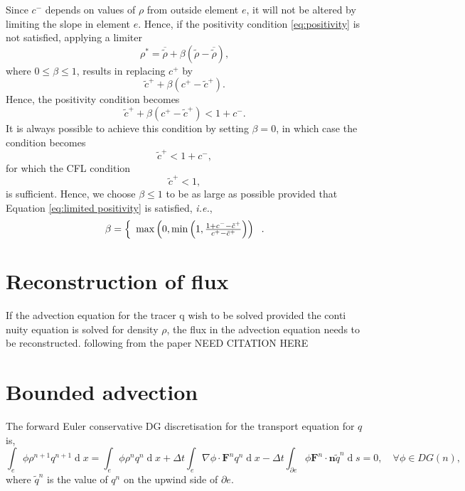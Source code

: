 \documentclass{article}
\def\MM#1{\boldsymbol{#1}}
\def\MM#1{\boldsymbol{#1}}
\DeclareMathOperator{\diff}{d}
\begin{document}
Since $c^-$ depends on values of $\rho$ from outside element $e$,
it will not be altered by limiting the slope in element $e$. Hence,
if the positivity condition \eqref{eq:positivity} is not satisfied,
applying a limiter
\begin{equation}
\rho^* = \overline{\tilde{\rho}} + \beta\left(
\tilde{\rho} - \overline{\tilde{\rho}}
\right),
\end{equation}
where $0\le \beta \le 1$, results in replacing $c^+$ by
\begin{equation}
\tilde{c}^+ + \beta(c^+-\tilde{c}^+).
\end{equation}
Hence, the positivity condition becomes
\begin{equation}
\label{eq:limited positivity}
\tilde{c}^+ + \beta(c^+-\tilde{c}^+) < 1 + c^-.
\end{equation}
It is always possible to achieve this condition by setting
$\beta=0$, in which case the condition becomes
\begin{equation}
\tilde{c}^+ < 1 + c^-,
\end{equation}
for which the CFL condition
\begin{equation}
\tilde{c}^+ < 1,
\end{equation}
is sufficient. Hence, we choose $\beta\leq 1$ to be as
large as possible provided that Equation \eqref{eq:limited positivity}
is satisfied, \emph{i.e.},
\begin{equation}
\beta =
\left\{
\begin{array}{c r}
 \max\left(0,\min\left(1,\frac{1 + c^- - \tilde{c}^+}
{c^+-\tilde{c}^+}\right)\right)
\end{array}\right..
\end{equation}

\section{Reconstruction of flux}
If the advection equation for the tracer q wish to be solved provided the conti
nuity equation is solved for density $\rho$, the flux in the advection equation
needs to be reconstructed. following from the paper {NEED CITATION HERE}
\section{Bounded advection}

The forward Euler conservative DG discretisation for the transport
equation for $q$ is,
\begin{equation}
\int_e \phi \rho^{n+1}q^{n+1} \diff x 
= \int_e \phi \rho^nq^n \diff x 
+ \Delta t \int_e \nabla \phi \cdot\MM{F}^n q^n\diff x
- \Delta t\int_{\partial e} \phi \MM{F}^n\cdot\MM{n} \tilde{q}^n \diff s = 0,
\quad \forall \phi \in DG(n),
\end{equation}
where $\tilde{q}^n$ is the value of $q^n$ on the upwind side of
$\partial e$.
\end{document}

